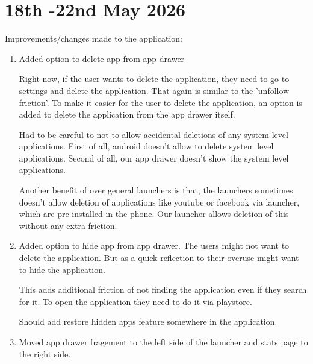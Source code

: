 \documentclass{article}
\begin{document}
\section{18th -22nd May 2026}
Improvements/changes made to the application: 
\begin{enumerate}
    \item Added option to delete app from app drawer
    
    Right now, if the user wants to delete the application, they need to go to settings and delete the application. That again is similar to the 'unfollow friction'. To make it easier for the user to delete the application, an option is added to delete the application from the app drawer itself.

    Had to be careful to not to allow accidental deletions of any system level applications. First of all, android doesn't allow to delete system level applications. Second of all, our app drawer doesn't show the system level applications.

    Another benefit of over general launchers is that, the launchers sometimes doesn't allow deletion of applications like youtube or facebook via launcher, which are pre-installed in the phone. Our launcher allows deletion of this without any extra friction.
    \item Added option to hide app from app drawer. The users might not want to delete the application. But as a quick reflection to their overuse might want to hide the application. 
    
    This adds additional friction of not finding the application even if they search for it. To open the application they need to do it via playstore.

    Should add restore hidden apps feature somewhere in the application. 
    \item Moved app drawer fragement to the left side of the launcher and stats page to the right side.
    

\end{enumerate}
\end{document}
